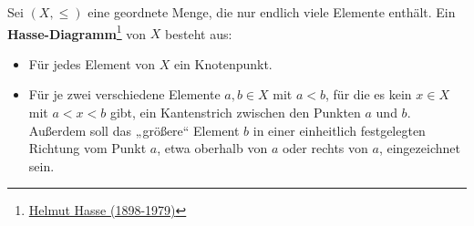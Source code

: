 \begin{defin} \label{def:hasse} 
    Sei $(X,\le)$ eine geordnete Menge, die nur endlich viele Elemente enthält. Ein \textbf{Hasse-Diagramm}\footnote{\href{https://de.wikipedia.org/wiki/Helmut_Hasse}{Helmut Hasse (1898-1979)}} von $X$ besteht aus:
    \begin{itemize}
        \item Für jedes Element von $X$ ein Knotenpunkt.
        \item Für je zwei verschiedene Elemente $a,b\in X$ mit $a<b$, für die es kein $x\in X$ mit $a<x<b$ gibt, ein Kantenstrich zwischen den Punkten $a$ und $b$. Außerdem soll das „größere“ Element $b$ in einer einheitlich festgelegten Richtung vom Punkt $a$, etwa oberhalb von $a$ oder rechts von $a$, eingezeichnet sein.
    \end{itemize}
\end{defin}


